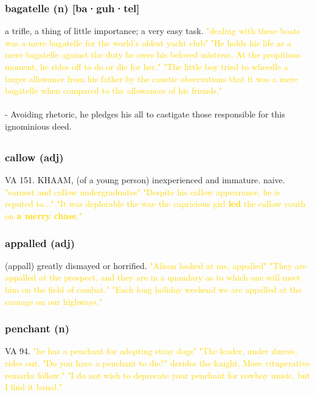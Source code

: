 \documentclass{proc}
\begin{document}
	\subsubsection{\textcolor{brickred}{bagatelle} (n) [ba·guh·tel]}
	a trifle, a thing of little importance; a very easy task.
	\textcolor{gold}{"dealing with these boats was a mere bagatelle for the world's oldest yacht club" "He holds his life as a mere bagatelle against the duty he owes his beloved mistress. At the propitious moment, he rides off to do or die for her." "The little boy tried to wheedle a larger allowance from his father by the caustic observations that it was a mere bagatelle when compared to the allowances of his friends."}\\\\
	- Avoiding rhetoric, he pledges his all to castigate those responsible for this ignominious deed.
	
	\newpage
	\subsection{}
	\subsubsection{\textcolor{brickred}{callow} (adj)}
	VA 151. KHAAM, (of a young person) inexperienced and immature. naive.
	\textcolor{gold}{"earnest and callow undergraduates" "Despite his callow appearance, he is reputed to..." "It was deplorable the way the capricious girl \textbf{led} the callow youth on \textbf{a merry chase}."}
	
	\subsubsection{\textcolor{brickred}{appalled} (adj)}
	(appall) greatly dismayed or horrified.
	\textcolor{gold}{"Alison looked at me, appalled" "They are appalled at the prospect, and they are in a quandary as to which one will meet him on the field of combat." "Each long holiday weekend we are appalled at the carnage on our highways."}
	
	\subsubsection{\textcolor{brickred}{penchant} (n)}
	VA 94.
	\textcolor{gold}{"he has a penchant for adopting stray dogs" "The leader, under duress, rides out. "Do you have a penchant to die?" derides the knight. More vituperative remarks follow." "I do not wish to deprecate your penchant for cowboy music, but I find it banal."}
	
\end{document}
